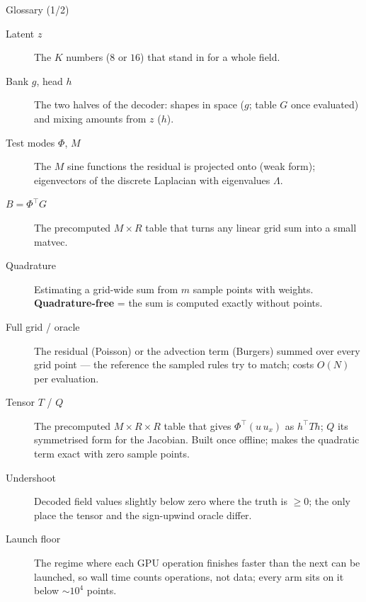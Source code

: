 \documentclass[10pt,aspectratio=169]{beamer}
\newcommand{\T}{^{\top}}
\begin{document}
\begin{frame}{Glossary (1/2)}
  \small
  \begin{description}
    \item[Latent $z$] The $K$ numbers ($8$ or $16$) that stand in for a whole field.
    \item[Bank $g$, head $h$] The two halves of the decoder: shapes in space ($g$; table $G$ once evaluated) and mixing amounts from $z$ ($h$).
    \item[Test modes $\Phi$, $M$] The $M$ sine functions the residual is projected onto (weak form); eigenvectors of the discrete Laplacian with eigenvalues $\Lambda$.
    \item[$B=\Phi\T G$] The precomputed $M\times R$ table that turns any linear grid sum into a small matvec.
    \item[Quadrature] Estimating a grid-wide sum from $m$ sample points with weights. \textbf{Quadrature-free} = the sum is computed exactly without points.
    \item[Full grid / oracle] The residual (Poisson) or the advection term (Burgers) summed over every grid point --- the reference the sampled rules try to match; costs $O(N)$ per evaluation.
    \item[Tensor $T$ / $Q$] The precomputed $M\times R\times R$ table that gives $\Phi\T(u\,u_x)$ as $h\T T h$; $Q$ its symmetrised form for the Jacobian. Built once offline; makes the quadratic term exact with zero sample points.
    \item[Undershoot] Decoded field values slightly below zero where the truth is $\ge 0$; the only place the tensor and the sign-upwind oracle differ.
    \item[Launch floor] The regime where each GPU operation finishes faster than the next can be launched, so wall time counts operations, not data; every arm sits on it below $\sim10^4$ points.
  \end{description}
\end{frame}
\end{document}
